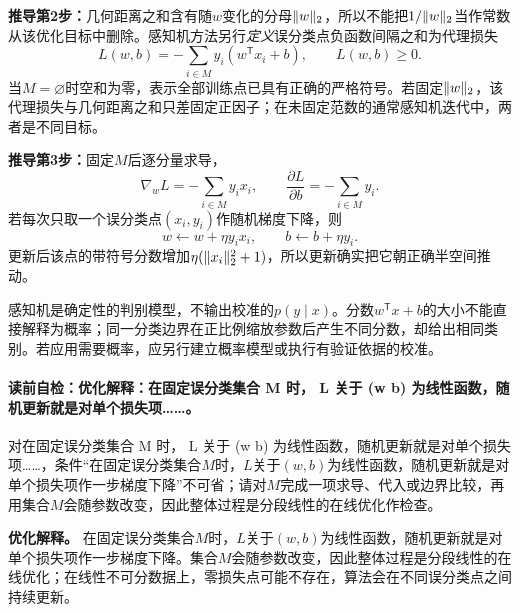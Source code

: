 \textbf{推导第2步：}几何距离之和含有随$w$变化的分母$\lVert w\rVert_2$，所以不能把$1/\lVert w\rVert_2$当作常数从该优化目标中删除。感知机方法另行\emph{定义}误分类点负函数间隔之和为代理损失
\[
L(w,b)=-\sum_{i\in M}y_i(w^{\mathsf T}x_i+b),\qquad L(w,b)\ge0.
\]
当$M=\varnothing$时空和为零，表示全部训练点已具有正确的严格符号。若固定$\lVert w\rVert_2$，该代理损失与几何距离之和只差固定正因子；在未固定范数的通常感知机迭代中，两者是不同目标。

\textbf{推导第3步：}固定$M$后逐分量求导，
\[
\nabla_w L=-\sum_{i\in M}y_i x_i,
\qquad
\frac{\partial L}{\partial b}=-\sum_{i\in M}y_i.
\]
若每次只取一个误分类点$(x_i,y_i)$作随机梯度下降，则
\[
w\leftarrow w+\eta y_i x_i,\qquad b\leftarrow b+\eta y_i.
\]
更新后该点的带符号分数增加$\eta(\lVert x_i\rVert_2^2+1)$，所以更新确实把它朝正确半空间推动。

\label{struct:V2-C01-CH15}
\begin{probabilitybox}
感知机是确定性的判别模型，不输出校准的$p(y\mid x)$。分数$w^{\mathsf T}x+b$的大小不能直接解释为概率；同一分类边界在正比例缩放参数后产生不同分数，却给出相同类别。若应用需要概率，应另行建立概率模型或执行有验证依据的校准。
\end{probabilitybox}

\label{struct:V2-C01-CH16}
\paragraph{读前自检：优化解释：在固定误分类集合 M 时， L 关于 (w b) 为线性函数，随机更新就是对单个损失项……。}对在固定误分类集合 M 时， L 关于 (w b) 为线性函数，随机更新就是对单个损失项……，条件“在固定误分类集合$M$时，$L$关于$(w,b)$为线性函数，随机更新就是对单个损失项作一步梯度下降”不可省；请对$M$完成一项求导、代入或边界比较，再用集合$M$会随参数改变，因此整体过程是分段线性的在线优化作检查。\par

\begin{optimizationbox}
\textbf{优化解释。}
在固定误分类集合$M$时，$L$关于$(w,b)$为线性函数，随机更新就是对单个损失项作一步梯度下降。集合$M$会随参数改变，因此整体过程是分段线性的在线优化；在线性不可分数据上，零损失点可能不存在，算法会在不同误分类点之间持续更新。
\end{optimizationbox}

